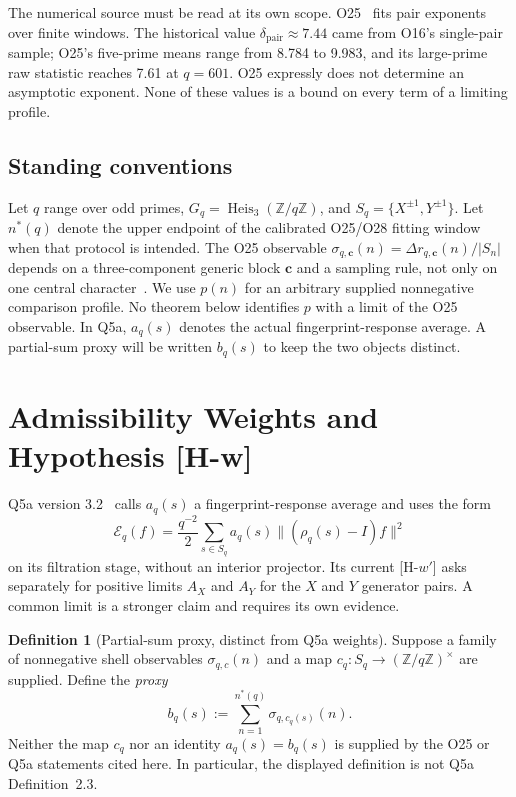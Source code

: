 \documentclass[12pt]{article}
\theoremstyle{definition}
\newtheorem{definition}[theorem]{Definition}
\theoremstyle{remark}
\DeclareMathOperator{\Heis}{Heis}
\newcommand{\Eq}{\mathcal{E}_q}
\begin{document}
  The numerical source must be read at its own scope.
  O25~\cite{Beau2026a29} fits pair exponents over finite windows.
  The historical value $\delta_{\mathrm{pair}}\approx7.44$ came from O16's
  single-pair sample; O25's five-prime means range from 8.784 to 9.983, and its
  large-prime raw statistic reaches 7.61 at $q=601$.
  O25 expressly does not determine an asymptotic exponent.
  None of these values is a bound on every term of a limiting profile.

  \subsection*{Standing conventions}

  Let $q$ range over odd primes, $G_q=\Heis_3(\mathbb Z/q\mathbb Z)$,
  and $S_q=\{X^{\pm1},Y^{\pm1}\}$.
  Let $n^*(q)$ denote the upper endpoint of the calibrated O25/O28 fitting
  window when that protocol is intended.
  The O25 observable $\sigma_{q,\mathbf c}(n)=\Delta r_{q,\mathbf c}(n)/|S_n|$
  depends on a three-component generic block $\mathbf c$ and a sampling rule,
  not only on one central character~\cite{Beau2026a29}.
  We use $p(n)$ for an arbitrary supplied nonnegative comparison profile.
  No theorem below identifies $p$ with a limit of the O25 observable.
  In Q5a, $a_q(s)$ denotes the actual fingerprint-response average.
  A partial-sum proxy will be written $b_q(s)$ to keep the two objects distinct.
  \section{Admissibility Weights and Hypothesis [H-w]}

  Q5a version 3.2~\cite{Beau2026q5a} calls $a_q(s)$ a fingerprint-response
  average and uses the form
  \[
    \Eq(f)=\frac{q^{-2}}{2}\sum_{s\in S_q}a_q(s)
    \|(\rho_q(s)-I)f\|^2
  \]
  on its filtration stage, without an interior projector.
  Its current [H-$w'$] asks separately for positive limits $A_X$ and $A_Y$
  for the $X$ and $Y$ generator pairs.
  A common limit is a stronger claim and requires its own evidence.

  \begin{definition}[Partial-sum proxy, distinct from Q5a weights]
    \label{def:aw}
    Suppose a family of nonnegative shell observables
    $\sigma_{q,c}(n)$ and a map $c_q:S_q\to(\mathbb Z/q\mathbb Z)^\times$
    are supplied.
    Define the \emph{proxy}
    \begin{equation}
      \label{eq:aw}
      b_q(s):=\sum_{n=1}^{n^*(q)}\sigma_{q,c_q(s)}(n).
    \end{equation}
    Neither the map $c_q$ nor an identity $a_q(s)=b_q(s)$ is supplied by
    the O25 or Q5a statements cited here.
    In particular, the displayed definition is not Q5a Definition~2.3.
  \end{definition}
\end{document}
